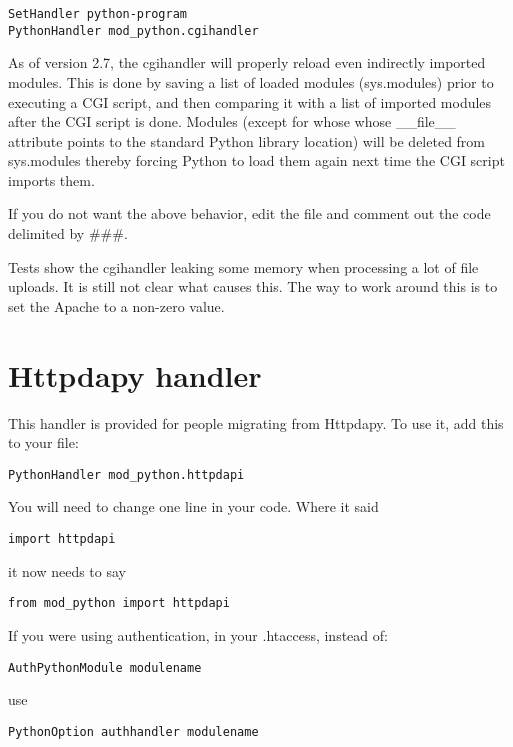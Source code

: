 \begin{verbatim}
SetHandler python-program
PythonHandler mod_python.cgihandler
\end{verbatim}

As of version 2.7, the cgihandler will properly reload even indirectly
imported modules. This is done by saving a list of loaded modules
(sys.modules) prior to executing a CGI script, and then comparing it
with a list of imported modules after the CGI script is done.  Modules
(except for whose whose __file__ attribute points to the standard
Python library location) will be deleted from sys.modules thereby
forcing Python to load them again next time the CGI script imports
them.

If you do not want the above behavior, edit the 
file and comment out the code delimited by \#\#\#.

Tests show the cgihandler leaking some memory when processing a lot of
file uploads. It is still not clear what causes this. The way to work
around this is to set the Apache  to a non-zero
value.

\section{Httpdapy handler\label{hand-httpdapy}}

This handler is provided for people migrating from Httpdapy. To use
it, add this to your  file:

\begin{verbatim}
PythonHandler mod_python.httpdapi
\end{verbatim}

You will need to change one line in your code. Where it said

\begin{verbatim}
import httpdapi
\end{verbatim}

it now needs to say

\begin{verbatim}
from mod_python import httpdapi
\end{verbatim}    

If you were using authentication, in your .htaccess, instead of:

\begin{verbatim}
AuthPythonModule modulename
\end{verbatim}    

use
\begin{verbatim}
PythonOption authhandler modulename
\end{verbatim}    


